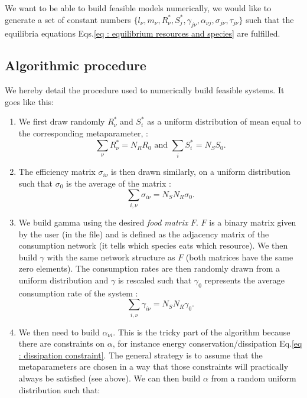 \documentclass[12pt, titlepage]{report}
\begin{document}
We want to be able to build feasible models numerically, \ie we would like to generate a set of constant numbers $\{
l_\nu, m_\nu, R^*_\nu, S^*_j, \gamma_{j\nu}, \alpha_{\nu j}, \sigma_{j\nu}, \tau_{j\nu}\}$ such that the equilibria equations Eqs.\eqref{eq : equilibrium resources and species} are fulfilled.


\subsection{Algorithmic procedure}
We hereby detail the procedure used to numerically build feasible systems. It goes like this:
\begin{enumerate}
  \item We first draw randomly $R^*_\nu$
  and $S^*_i$ as a uniform distribution of mean equal to the corresponding metaparameter, \ie :
  \begin{equation}
    \sum_\nu R^*_\nu = N_R R_0 \text{ and } \sum_i S^*_i = N_S S_0.
  \end{equation}
  \item The efficiency matrix $\sigma_{i\nu}$ is then drawn similarly, on a uniform distribution such that $\sigma_0$ is the average of the matrix :
  \begin{equation}
    \sum_{i,\nu} \sigma_{i\nu} = N_S N_R \sigma_0.
  \end{equation}
  \item We build gamma using the desired \textit{food matrix} $F$. $F$ is a binary matrix given by the user (in the  file) and is defined as the adjacency matrix of the consumption network (\ie it tells which species eats which resource). We then build $\gamma$ with the same network structure as $F$ (\ie both matrices have the same zero elements). The consumption rates are then randomly drawn from a uniform distribution and $\gamma$ is rescaled such that $\gamma_0$ represents the average consumption rate of the system :
  \begin{equation}
    \sum_{i,\nu} \gamma_{i\nu} = N_S N_R \gamma_0.
  \end{equation}
  \item We then need to build $\alpha_{\nu i}$. This is the tricky part of the algorithm because there are constraints on $\alpha$, for instance energy conservation/dissipation Eq.\eqref{eq : dissipation constraint}. The general strategy is to assume that the metaparameters are chosen in a way that those constraints will practically always be satisfied (see above). We can then build $\alpha$ from a random uniform distribution such that:

\end{enumerate}
\end{document}
